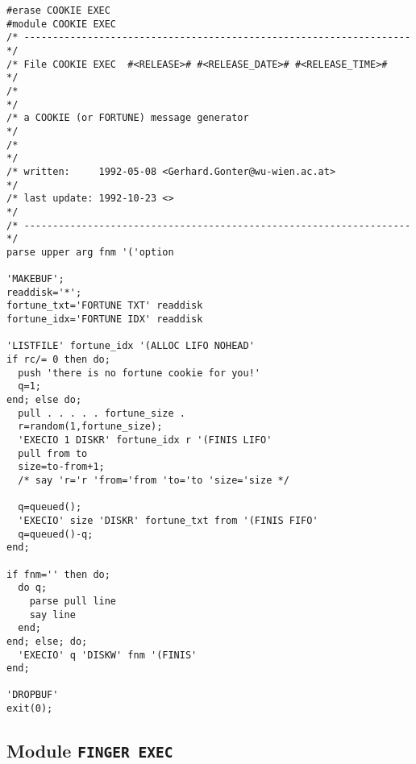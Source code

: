 \begin{verbatim}
#erase COOKIE EXEC
#module COOKIE EXEC
/* ------------------------------------------------------------------- */
/* File COOKIE EXEC  #<RELEASE># #<RELEASE_DATE># #<RELEASE_TIME>#     */
/*                                                                     */
/* a COOKIE (or FORTUNE) message generator                             */
/*                                                                     */
/* written:     1992-05-08 <Gerhard.Gonter@wu-wien.ac.at>              */
/* last update: 1992-10-23 <>                                          */
/* ------------------------------------------------------------------- */
parse upper arg fnm '('option

'MAKEBUF';
readdisk='*';
fortune_txt='FORTUNE TXT' readdisk
fortune_idx='FORTUNE IDX' readdisk

'LISTFILE' fortune_idx '(ALLOC LIFO NOHEAD'
if rc/= 0 then do;
  push 'there is no fortune cookie for you!'
  q=1;
end; else do;
  pull . . . . . fortune_size .
  r=random(1,fortune_size);
  'EXECIO 1 DISKR' fortune_idx r '(FINIS LIFO'
  pull from to
  size=to-from+1;
  /* say 'r='r 'from='from 'to='to 'size='size */

  q=queued();
  'EXECIO' size 'DISKR' fortune_txt from '(FINIS FIFO'
  q=queued()-q;
end;

if fnm='' then do;
  do q;
    parse pull line
    say line
  end;
end; else; do;
  'EXECIO' q 'DISKW' fnm '(FINIS'
end;

'DROPBUF'
exit(0);
\end{verbatim}

\subsection{Module {\tt FINGER EXEC}}

\def\LPtopD{Module {\tt FINGER EXEC}}

\def\LPtopF{~}

